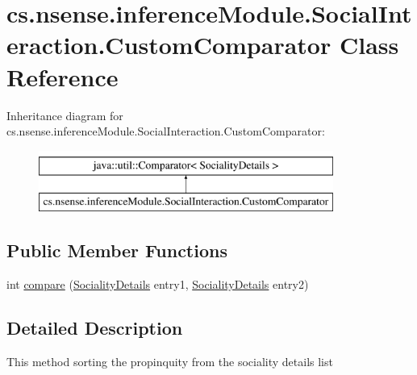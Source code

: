 \hypertarget{classcs_1_1nsense_1_1inference_module_1_1_social_interaction_1_1_custom_comparator}{\section{cs.\-nsense.\-inference\-Module.\-Social\-Interaction.\-Custom\-Comparator Class Reference}
\label{classcs_1_1nsense_1_1inference_module_1_1_social_interaction_1_1_custom_comparator}
}
Inheritance diagram for cs.\-nsense.\-inference\-Module.\-Social\-Interaction.\-Custom\-Comparator\-:\begin{figure}[H]
\begin{center}
\leavevmode
\includegraphics[height=2.000000cm]{classcs_1_1nsense_1_1inference_module_1_1_social_interaction_1_1_custom_comparator}
\end{center}
\end{figure}
\subsection*{Public Member Functions}
\begin{DoxyCompactItemize}
\item 
int \hyperlink{classcs_1_1nsense_1_1inference_module_1_1_social_interaction_1_1_custom_comparator_ae24bf269b204a0bcf4ba78f86b9ad59a}{compare} (\hyperlink{classcs_1_1nsense_1_1inference_module_1_1_sociality_details}{Sociality\-Details} entry1, \hyperlink{classcs_1_1nsense_1_1inference_module_1_1_sociality_details}{Sociality\-Details} entry2)
\end{DoxyCompactItemize}


\subsection{Detailed Description}
This method sorting the propinquity from the sociality details list 

